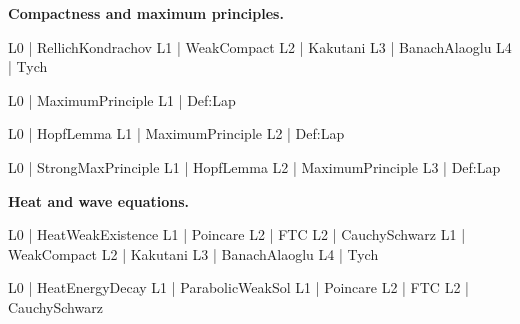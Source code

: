 \documentclass[11pt,reqno]{amsart}
\begin{document}
	\medskip
	
	\noindent\textbf{Compactness and maximum principles.}
	
	\noindent%
	\begin{minipage}[t]{0.48\linewidth}
		\vspace{0pt}
		\begin{verbatimbox}
			L0 | RellichKondrachov
			L1 |   WeakCompact
			L2 |     Kakutani
			L3 |       BanachAlaoglu
			L4 |         Tych
		\end{verbatimbox}
	\end{minipage}\hfill
	\begin{minipage}[t]{0.48\linewidth}
		\vspace{0pt}
		\begin{verbatimbox}
			L0 | MaximumPrinciple
			L1 |   Def:Lap
		\end{verbatimbox}
	\end{minipage}
	
	\medskip
	
	\noindent%
	\begin{minipage}[t]{0.48\linewidth}
		\vspace{0pt}
		\begin{verbatimbox}
			L0 | HopfLemma
			L1 |   MaximumPrinciple
			L2 |     Def:Lap
		\end{verbatimbox}
	\end{minipage}\hfill
	\begin{minipage}[t]{0.48\linewidth}
		\vspace{0pt}
		\begin{verbatimbox}
			L0 | StrongMaxPrinciple
			L1 |   HopfLemma
			L2 |     MaximumPrinciple
			L3 |       Def:Lap
		\end{verbatimbox}
	\end{minipage}
	
	\medskip
	
	\noindent\textbf{Heat and wave equations.}
	
	\noindent%
	\begin{minipage}[t]{0.48\linewidth}
		\vspace{0pt}
		\begin{verbatimbox}
			L0 | HeatWeakExistence
			L1 |   Poincare
			L2 |     FTC
			L2 |     CauchySchwarz
			L1 |   WeakCompact
			L2 |     Kakutani
			L3 |       BanachAlaoglu
			L4 |         Tych
		\end{verbatimbox}
	\end{minipage}\hfill
	\begin{minipage}[t]{0.48\linewidth}
		\vspace{0pt}
		\begin{verbatimbox}
			L0 | HeatEnergyDecay
			L1 |   ParabolicWeakSol
			L1 |   Poincare
			L2 |     FTC
			L2 |     CauchySchwarz
		\end{verbatimbox}
	\end{minipage}
	
\end{document}
